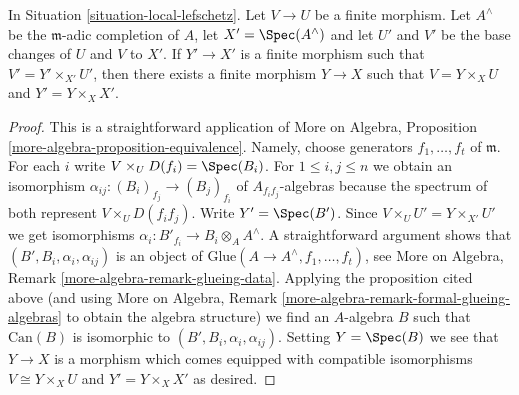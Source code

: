 \begin{lemma}
\label{lemma-fill-in-missing}
In Situation \ref{situation-local-lefschetz}. Let $V \to U$ be a finite
morphism.  Let $A^\wedge$ be the $\mathfrak m$-adic completion of $A$,
let $X' = \Spec(A^\wedge)$ and let $U'$ and $V'$ be the base changes of
$U$ and $V$ to $X'$. If $Y' \to X'$ is a finite morphism such that
$V' = Y' \times_{X'} U'$, then there exists a finite morphism $Y \to X$
such that $V = Y \times_X U$ and $Y' = Y \times_X X'$.
\end{lemma}

\begin{proof}
This is a straightforward application of
More on Algebra, Proposition \ref{more-algebra-proposition-equivalence}.
Namely, choose generators $f_1, \ldots, f_t$ of $\mathfrak m$.
For each $i$ write $V \times_U D(f_i) = \Spec(B_i)$.
For $1 \leq i, j \leq n$ we obtain an isomorphism
$\alpha_{ij} : (B_i)_{f_j} \to (B_j)_{f_i}$ of $A_{f_if_j}$-algebras
because the spectrum of both represent $V \times_U D(f_if_j)$.
Write $Y' = \Spec(B')$. Since $V \times_U U' = Y \times_{X'} U'$
we get isomorphisms $\alpha_i : B'_{f_i} \to B_i \otimes_A A^\wedge$.
A straightforward argument shows that $(B', B_i, \alpha_i, \alpha_{ij})$
is an object of $\text{Glue}(A \to A^\wedge, f_1, \ldots, f_t)$, see
More on Algebra, Remark \ref{more-algebra-remark-glueing-data}.
Applying the proposition cited above (and using
More on Algebra, Remark \ref{more-algebra-remark-formal-glueing-algebras}
to obtain the algebra structure) we find an $A$-algebra $B$ such that
$\text{Can}(B)$ is isomorphic to $(B', B_i, \alpha_i, \alpha_{ij})$.
Setting $Y = \Spec(B)$ we see that $Y \to X$ is a morphism
which comes equipped with compatible isomorphisms
$V \cong Y \times_X U$ and $Y' = Y \times_X X'$ as desired.
\end{proof}
